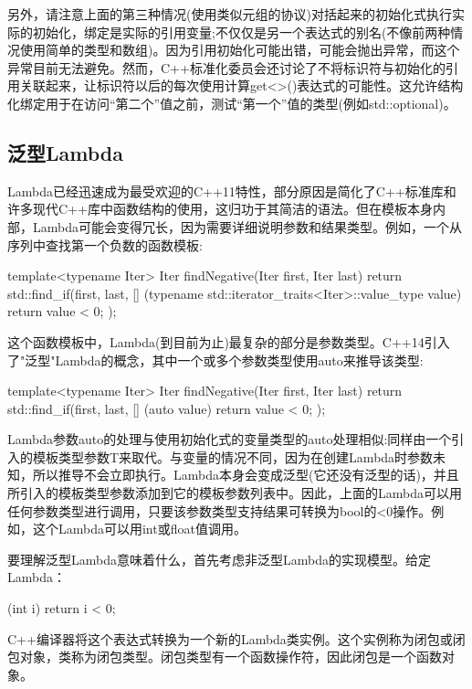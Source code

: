 另外，请注意上面的第三种情况(使用类似元组的协议)对括起来的初始化式执行实际的初始化，绑定是实际的引用变量;不仅仅是另一个表达式的别名(不像前两种情况使用简单的类型和数组)。因为引用初始化可能出错，可能会抛出异常，而这个异常目前无法避免。然而，C++标准化委员会还讨论了不将标识符与初始化的引用关联起来，让标识符以后的每次使用计算get<>()表达式的可能性。这允许结构化绑定用于在访问“第二个”值之前，测试“第一个”值的类型(例如std::optional)。

\subsection{泛型Lambda}

Lambda已经迅速成为最受欢迎的C++11特性，部分原因是简化了C++标准库和许多现代C++库中函数结构的使用，这归功于其简洁的语法。但在模板本身内部，Lambda可能会变得冗长，因为需要详细说明参数和结果类型。例如，一个从序列中查找第一个负数的函数模板:

\begin{cpp}
template<typename Iter>
Iter findNegative(Iter first, Iter last)
{
	return std::find_if(first, last,
						[] (typename std::iterator_traits<Iter>::value_type
						value) {
							return value < 0;
						});
}
\end{cpp}

这个函数模板中，Lambda(到目前为止)最复杂的部分是参数类型。C++14引入了"泛型"Lambda的概念，其中一个或多个参数类型使用auto来推导该类型:

\begin{cpp}
template<typename Iter>
Iter findNegative(Iter first, Iter last)
{
	return std::find_if(first, last,
						[] (auto value) {
							return value < 0;
						});
}
\end{cpp}

Lambda参数auto的处理与使用初始化式的变量类型的auto处理相似:同样由一个引入的模板类型参数T来取代。与变量的情况不同，因为在创建Lambda时参数未知，所以推导不会立即执行。Lambda本身会变成泛型(它还没有泛型的话)，并且所引入的模板类型参数添加到它的模板参数列表中。因此，上面的Lambda可以用任何参数类型进行调用，只要该参数类型支持结果可转换为bool的<0操作。例如，这个Lambda可以用int或float值调用。

要理解泛型Lambda意味着什么，首先考虑非泛型Lambda的实现模型。给定Lambda：

\begin{cpp}
[] (int i) {
	return i < 0;
}
\end{cpp}

C++编译器将这个表达式转换为一个新的Lambda类实例。这个实例称为闭包或闭包对象，类称为闭包类型。闭包类型有一个函数操作符，因此闭包是一个函数对象。

